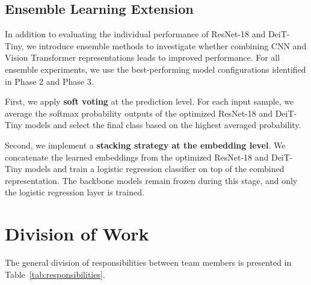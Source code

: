 \documentclass[12pt,a4paper]{article}
\begin{document}
\subsection{Ensemble Learning Extension}

In addition to evaluating the individual performance of ResNet-18 and DeiT-Tiny, we introduce ensemble methods to investigate whether combining CNN and Vision Transformer representations leads to improved performance. For all ensemble experiments, we use the best-performing model configurations identified in Phase 2 and Phase 3.

First, we apply \textbf{soft voting} at the prediction level. For each input sample, we average the softmax probability outputs of the optimized ResNet-18 and DeiT-Tiny models and select the final class based on the highest averaged probability.

Second, we implement a \textbf{stacking strategy at the embedding level}. We concatenate the learned embeddings from the optimized ResNet-18 and DeiT-Tiny models and train a logistic regression classifier on top of the combined representation. The backbone models remain frozen during this stage, and only the logistic regression layer is trained.


\section{Division of Work}

The general division of responsibilities between team members is presented in Table~\ref{tab:responsibilities}.
\end{document}
